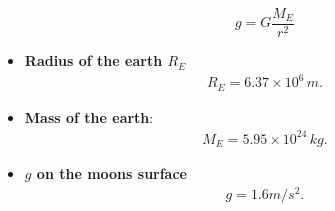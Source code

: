 \documentclass{report}
\begin{document}
\begin{itemize}
\begin{equation}
                g = G \frac{M_E}{r^2}
            \end{equation}
        \item \textbf{Radius of the earth $R_{E}$}
            \begin{align*}
                R_{E} = 6.37 \times 10^{6}\, m
            .\end{align*}
        \item \textbf{Mass of the earth}:
            \begin{align*}
                M_{E} = 5.95 \times 10^{24}\, kg
            .\end{align*}
        \item \textbf{$g$ on the moons surface}
            \begin{align*}
                g = 1.6 m/s^{2}
            .\end{align*}
 

\end{itemize}
\end{document}

